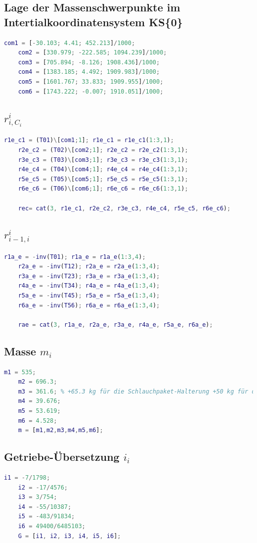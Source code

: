 \subsection{Lage der Massenschwerpunkte im Intertialkoordinatensystem KS\{0\}}
%
\begin{lstlisting}[language=Matlab, numbers=none]
	com1 = [-30.103; 4.41; 452.213]/1000;
	com2 = [330.979; -222.585; 1094.239]/1000;
	com3 = [705.894; -8.126; 1908.436]/1000;
	com4 = [1383.185; 4.492; 1909.983]/1000;
	com5 = [1601.767; 33.833; 1909.955]/1000;
	com6 = [1743.222; -0.007; 1910.051]/1000;
\end{lstlisting}
%
\subsection{$r^{i}_{i,C_i}$}
%
\begin{lstlisting}[language=Matlab, numbers=none]
	r1e_c1 = (T01)\[com1;1]; r1e_c1 = r1e_c1(1:3,1);
	r2e_c2 = (T02)\[com2;1]; r2e_c2 = r2e_c2(1:3,1);
	r3e_c3 = (T03)\[com3;1]; r3e_c3 = r3e_c3(1:3,1);
	r4e_c4 = (T04)\[com4;1]; r4e_c4 = r4e_c4(1:3,1);
	r5e_c5 = (T05)\[com5;1]; r5e_c5 = r5e_c5(1:3,1);
	r6e_c6 = (T06)\[com6;1]; r6e_c6 = r6e_c6(1:3,1);
	
	rec= cat(3, r1e_c1, r2e_c2, r3e_c3, r4e_c4, r5e_c5, r6e_c6);
\end{lstlisting}
%
\subsection{$r^{i}_{i-1,i}$}
%
\begin{lstlisting}[language=Matlab, numbers=none]
	r1a_e = -inv(T01); r1a_e = r1a_e(1:3,4);
	r2a_e = -inv(T12); r2a_e = r2a_e(1:3,4);
	r3a_e = -inv(T23); r3a_e = r3a_e(1:3,4);
	r4a_e = -inv(T34); r4a_e = r4a_e(1:3,4);
	r5a_e = -inv(T45); r5a_e = r5a_e(1:3,4);
	r6a_e = -inv(T56); r6a_e = r6a_e(1:3,4);
	
	rae = cat(3, r1a_e, r2a_e, r3a_e, r4a_e, r5a_e, r6a_e);
\end{lstlisting}
%
\subsection{Masse $m_i$}
%
\begin{lstlisting}[language=Matlab, numbers=none]
	m1 = 535;
	m2 = 696.3;
	m3 = 361.6; % +65.3 kg für die Schlauchpaket-Halterung +50 kg für die Antriebe 4 und 5;
	m4 = 39.676;
	m5 = 53.619;
	m6 = 4.528;
	m = [m1,m2,m3,m4,m5,m6];
\end{lstlisting}
%
\subsection{Getriebe-Übersetzung $i_i$}
%
\begin{lstlisting}[language=Matlab, numbers=none]
	i1 = -7/1798;
	i2 = -17/4576;
	i3 = 3/754;
	i4 = -55/10387;
	i5 = -483/91834;
	i6 = 49400/6485103;
	G = [i1, i2, i3, i4, i5, i6];
\end{lstlisting}
%
